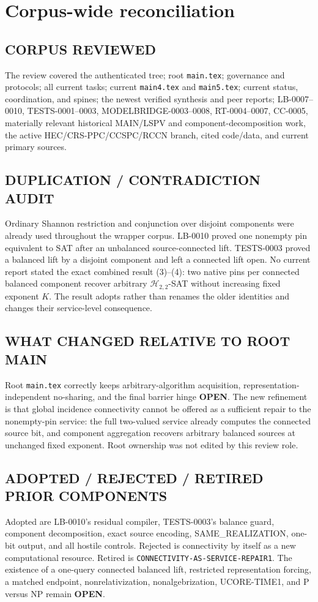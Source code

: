 \documentclass[11pt]{article}
\newcommand{\Htwo}{\mathcal H_{2,2}}
\newcommand{\OPEN}{\textbf{OPEN}}
\begin{document}
\section{Corpus-wide reconciliation}

\subsection*{CORPUS REVIEWED}
The review covered the authenticated tree; root \texttt{main.tex}; governance
and protocols; all current tasks; current \texttt{main4.tex} and
\texttt{main5.tex}; current status, coordination, and spines; the newest
verified synthesis and peer reports; LB-0007--0010, TESTS-0001--0003,
MODELBRIDGE-0003--0008, RT-0004--0007, CC-0005, materially relevant
historical MAIN/LSPV and component-decomposition work, the active
HEC/CRS-PPC/CCSPC/RCCN branch, cited code/data, and current primary sources.

\subsection*{DUPLICATION / CONTRADICTION AUDIT}
Ordinary Shannon restriction and conjunction over disjoint components were
already used throughout the wrapper corpus.  LB-0010 proved one nonempty pin
equivalent to SAT after an unbalanced source-connected lift.  TESTS-0003
proved a balanced lift by a disjoint component and left a connected lift open.
No current report stated the exact combined result (3)--(4): two native pins
per connected balanced component recover arbitrary $\Htwo$-SAT without
increasing fixed exponent $K$.  The result adopts rather than renames the
older identities and changes their service-level consequence.

\subsection*{WHAT CHANGED RELATIVE TO ROOT MAIN}
Root \texttt{main.tex} correctly keeps arbitrary-algorithm acquisition,
representation-independent no-sharing, and the final barrier hinge \OPEN.
The new refinement is that global incidence connectivity cannot be offered
as a sufficient repair to the nonempty-pin service: the full two-valued
service already computes the connected source bit, and component aggregation
recovers arbitrary balanced sources at unchanged fixed exponent.  Root
ownership was not edited by this review role.

\subsection*{ADOPTED / REJECTED / RETIRED PRIOR COMPONENTS}
Adopted are LB-0010's residual compiler, TESTS-0003's balance guard,
component decomposition, exact source encoding, SAME\_REALIZATION, one-bit
output, and all hostile controls.  Rejected is connectivity by itself as a
new computational resource.  Retired is
\texttt{CONNECTIVITY-AS-SERVICE-REPAIR1}.  The existence of a one-query
connected balanced lift, restricted representation forcing, a matched
endpoint, nonrelativization, nonalgebrization, UCORE-TIME1, and P versus NP
remain \OPEN.
\end{document}

